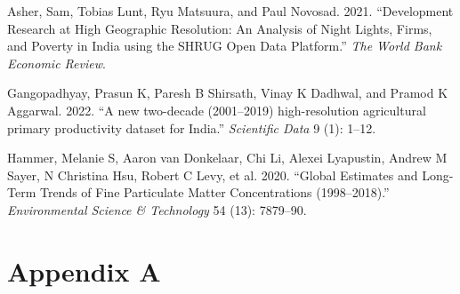 \documentclass[
]{article}
\newlength{\cslhangindent}
\newlength{\cslentryspacingunit} %
\newenvironment{CSLReferences}[2] %
 {%
  \setlength{\parindent}{0pt}
  \ifodd #1
  \let\oldpar\par
  \def\par{\hangindent=\cslhangindent\oldpar}
  \fi
  \setlength{\parskip}{#2\cslentryspacingunit}
 }%
 {}
\newcommand{\beginappendix}{ \setcounter{table}{0} \renewcommand{\thetable}{A\arabic{table}} \setcounter{figure}{0} \renewcommand{\thefigure}{A\arabic{figure}} }
\begin{document}
\hypertarget{refs}{}
\begin{CSLReferences}{1}{0}
\leavevmode{}%
Asher, Sam, Tobias Lunt, Ryu Matsuura, and Paul Novosad. 2021. {``{Development Research at High Geographic Resolution: An Analysis of Night Lights, Firms, and Poverty in India using the SHRUG Open Data Platform}.''} \emph{{The World Bank Economic Review}}.

\leavevmode{}%
Gangopadhyay, Prasun K, Paresh B Shirsath, Vinay K Dadhwal, and Pramod K Aggarwal. 2022. {``{A new two-decade (2001--2019) high-resolution agricultural primary productivity dataset for India}.''} \emph{{Scientific Data}} 9 (1): 1--12.

\leavevmode{}%
Hammer, Melanie S, Aaron van Donkelaar, Chi Li, Alexei Lyapustin, Andrew M Sayer, N Christina Hsu, Robert C Levy, et al. 2020. {``Global Estimates and Long-Term Trends of Fine Particulate Matter Concentrations (1998--2018).''} \emph{{Environmental Science \& Technology}} 54 (13): 7879--90.

\end{CSLReferences}

\FloatBarrier

\beginappendix

\newpage

\hypertarget{appendix-a}{%
\section*{Appendix A}\label{appendix-a}}

\FloatBarrier
\singlespacing
\end{document}
